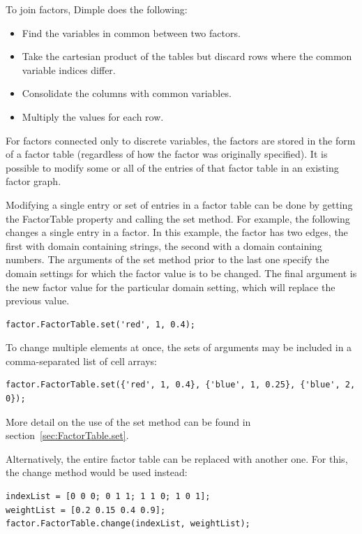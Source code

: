 To join factors, Dimple does the following:

\begin{itemize}
\item Find the variables in common between two factors.
\item Take the cartesian product of the tables but discard rows where the common variable indices differ.
\item Consolidate the columns with common variables.
\item Multiply the values for each row.
\end{itemize}



For factors connected only to discrete variables, the factors are stored in the form of a factor table (regardless of how the factor was originally specified).  It is possible to modify some or all of the entries of that factor table in an existing factor graph.

\ifmatlab

Modifying a single entry or set of entries in a factor table can be done by getting the FactorTable property and calling the set method.  For example, the following changes a single entry in a factor.  In this example, the factor has two edges, the first with domain containing strings, the second with a domain containing numbers.  The arguments of the set method prior to the last one specify the domain settings for which the factor value is to be changed.  The final argument is the new factor value for the particular domain setting, which will replace the previous value.

\begin{lstlisting}
factor.FactorTable.set('red', 1, 0.4);
\end{lstlisting}

To change multiple elements at once, the sets of arguments may be included in a comma-separated list of cell arrays:

\begin{lstlisting}
factor.FactorTable.set({'red', 1, 0.4}, {'blue', 1, 0.25}, {'blue', 2, 0});
\end{lstlisting}

More detail on the use of the set method can be found in section~\ref{sec:FactorTable.set}.

Alternatively, the entire factor table can be replaced with another one.  For this, the change method would be used instead:

\begin{lstlisting}
indexList = [0 0 0; 0 1 1; 1 1 0; 1 0 1];
weightList = [0.2 0.15 0.4 0.9];
factor.FactorTable.change(indexList, weightList);
\end{lstlisting}

